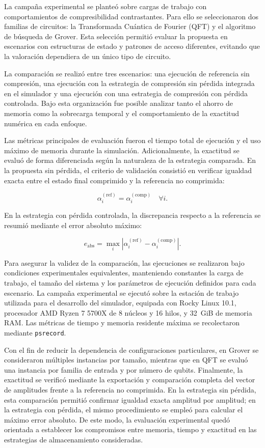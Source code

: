 La campaña experimental se planteó sobre cargas de trabajo con comportamientos de
compresibilidad contrastantes. Para ello se seleccionaron dos familias de circuitos: la
Transformada Cuántica de Fourier (QFT) y el algoritmo de búsqueda de Grover. Esta
selección permitió evaluar la propuesta en escenarios con estructuras de estado y
patrones de acceso diferentes, evitando que la valoración dependiera de un único tipo
de circuito.

La comparación se realizó entre tres escenarios: una ejecución de referencia sin
compresión, una ejecución con la estrategia de compresión sin pérdida integrada en el
simulador y una ejecución con una estrategia de compresión con pérdida controlada.
Bajo esta organización fue posible analizar tanto el ahorro de memoria como la
sobrecarga temporal y el comportamiento de la exactitud numérica en cada enfoque.

Las métricas principales de evaluación fueron el tiempo total de ejecución y el uso
máximo de memoria durante la simulación. Adicionalmente, la exactitud se evaluó de
forma diferenciada según la naturaleza de la estrategia comparada. En la propuesta sin
pérdida, el criterio de validación consistió en verificar igualdad exacta entre el estado
final comprimido y la referencia no comprimida:

\[
\alpha_i^{(\text{ref})} = \alpha_i^{(\text{comp})} \quad \forall i.
\]

En la estrategia con pérdida controlada, la discrepancia respecto a la referencia se
resumió mediante el error absoluto máximo:

\[
e_{\text{abs}} = \max_i \left|\alpha_i^{(\text{ref})} - \alpha_i^{(\text{comp})}\right|.
\]

Para asegurar la validez de la comparación, las ejecuciones se realizaron bajo
condiciones experimentales equivalentes, manteniendo constantes la carga de trabajo,
el tamaño del sistema y los parámetros de ejecución definidos para cada escenario. La
campaña experimental se ejecutó sobre la estación de trabajo utilizada para el
desarrollo del simulador, equipada con Rocky Linux 10.1, procesador AMD Ryzen 7
5700X de 8 núcleos y 16 hilos, y 32~GiB de memoria RAM. Las métricas de tiempo y
memoria residente máxima se recolectaron mediante \texttt{psrecord}.

Con el fin de reducir la dependencia de configuraciones particulares, en Grover se
consideraron múltiples instancias por tamaño, mientras que en QFT se evaluó una
instancia por familia de entrada y por número de qubits. Finalmente, la exactitud se
verificó mediante la exportación y comparación completa del vector de amplitudes
frente a la referencia no comprimida. En la estrategia sin pérdida, esta comparación
permitió confirmar igualdad exacta amplitud por amplitud; en la estrategia con pérdida,
el mismo procedimiento se empleó para calcular el máximo error absoluto. De este
modo, la evaluación experimental quedó orientada a establecer los compromisos entre
memoria, tiempo y exactitud en las estrategias de almacenamiento consideradas.
